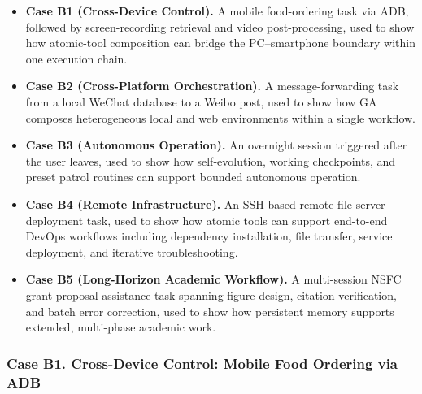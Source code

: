 \begin{itemize}[leftmargin=*]
\item \textbf{Case B1 (Cross-Device Control).} A mobile food-ordering task via ADB, followed by screen-recording retrieval and video post-processing, used to show how atomic-tool composition can bridge the PC--smartphone boundary within one execution chain.

\item \textbf{Case B2 (Cross-Platform Orchestration).} A message-forwarding task from a local WeChat database to a Weibo post, used to show how GA composes heterogeneous local and web environments within a single workflow.

\item \textbf{Case B3 (Autonomous Operation).} An overnight session triggered after the user leaves, used to show how self-evolution, working checkpoints, and preset patrol routines can support bounded autonomous operation.

\item \textbf{Case B4 (Remote Infrastructure).} An SSH-based remote file-server deployment task, used to show how atomic tools can support end-to-end DevOps workflows including dependency installation, file transfer, service deployment, and iterative troubleshooting.

\item \textbf{Case B5 (Long-Horizon Academic Workflow).} A multi-session NSFC grant proposal assistance task spanning figure design, citation verification, and batch error correction, used to show how persistent memory supports extended, multi-phase academic work.
\end{itemize}

\subsubsection{Case B1. Cross-Device Control: Mobile Food Ordering via ADB}
\label{app:case_cross_device}

